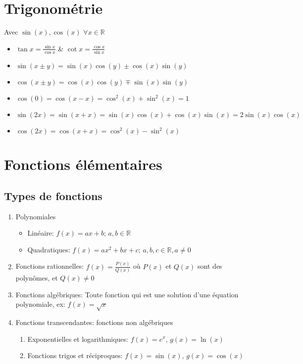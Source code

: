 \documentclass[10pt,a4paper]{book}
\newcommand{\R}{\mathbb{R}}
\begin{document}
\section{Trigonométrie}

Avec $\sin(x), \cos(x)$  $\forall x \in \R$
\begin{itemize}
\item $\tan x = \frac{\sin x}{\cos x}$ \& $\cot x = \frac{\cos x}{\sin x}$
\item $\sin(x\pm y) = \sin(x)\cos(y) \pm \cos(x)\sin(y)$
\item $\cos(x \pm y) = \cos(x)\cos(y) \mp \sin(x)\sin(y)$
\item $\cos(0) = \cos(x-x) = \cos^2(x) + \sin^2(x) = 1$
\item $\sin(2x) = \sin(x+x) = \sin(x)\cos(x) + \cos(x)\sin(x) = 2\sin(x)\cos(x)$
\item $\cos(2x) = \cos(x+x) = \cos^2(x) - \sin^2(x)$
\end{itemize}

\section{Fonctions élémentaires}

\subsection{Types de fonctions}
\begin{enumerate}
\item Polynomiales
\begin{itemize}
\item Linéaire: $f(x) = ax + b$; $a,b \in \R$
\item Quadratiques: $f(x) = ax^2 + bx + c$; $a,b,c \in \R, a \neq 0$
\end{itemize}
\item Fonctions rationnelles: $f(x) = \frac{P(x)}{Q(x)}$ où $P(x)$ et $Q(x)$ sont des polynômes, et $Q(x) \neq 0$
\item Fonctions algébriques: Toute fonction qui est une solution d'une équation polynomiale, ex: $f(x) = \sqrt{x}$
\item Fonctions transcendantes: fonctions non algébriques
\begin{enumerate}
\item Exponentielles et logarithmiques: $f(x) = e^x$, $g(x) = \ln(x)$
\item Fonctions trigos et réciproques: $f(x) = \sin(x)$, $g(x) = \cos(x)$ 
\end{enumerate}
\end{enumerate}
\end{document}
